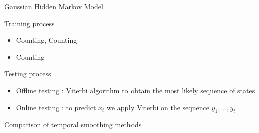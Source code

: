 \begin{frame}{Gaussian Hidden Markov Model}
	
	\begin{block}{Training process}
		\begin{itemize}
			\item Counting, Counting
			\item Counting
		\end{itemize}
	\end{block}
	
	\begin{block}{Testing process}
		\begin{itemize}
			\item Offline testing : Viterbi algorithm to obtain the most likely sequence of states
			\item Online testing : to predict $x_t$ we apply Viterbi on the sequence $y_1,...,y_t$
		\end{itemize}
	\end{block}

\end{frame}
	

\begin{frame}{Comparison of temporal smoothing methods}

	\begin{table}
	\begin{center}
	\end{center}
	\caption{With the predictions of our fine tuned ResNet-200}
	\end{table}

\end{frame}

